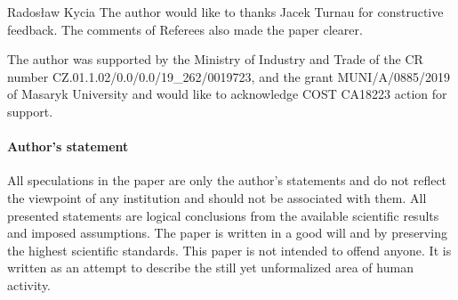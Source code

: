 \begin{artengenv}{Radosław Kycia}
The author would like to thanks Jacek Turnau for constructive feedback. The comments of Referees also made the paper clearer. 

The author was supported by the Ministry of Industry and Trade of the CR number CZ.01.1.02/0.0/0.0/19\_262/0019723, and the grant MUNI/A/0885/2019 of Masaryk University and would like to acknowledge COST CA18223 action for support. %



\paragraph{Author's statement}
All speculations in the paper are only the author's statements and do not reflect the viewpoint of any institution and should not be associated with them. All presented statements are logical conclusions from the available scientific results and imposed assumptions. The paper is written in a good will and by preserving the highest scientific standards. This paper is not intended to offend anyone. It is written as an attempt to describe the still yet unformalized area of human activity.

\end{artengenv}
\label{kycia_ende}



